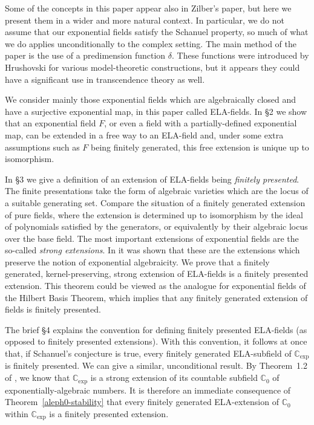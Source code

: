 \documentclass[12pt]{amsart}
\theoremstyle{definition}
\begin{document}
Some of the concepts in this paper appear also in Zilber's paper, but here we present them in a wider and more natural context. In particular, we do not assume that our exponential fields satisfy the Schanuel property, so much of what we do applies unconditionally to the complex setting. The main method of the paper is the use of a predimension function $\delta$. These functions were introduced by Hrushovski \cite{Hru93} for various model-theoretic constructions, but it appears they could have a significant use in transcendence theory as well.

We consider mainly those exponential fields which are algebraically closed and have a surjective exponential map, in this paper called ELA-fields. In \S2 we show that an exponential field $F$, or even a field with a partially-defined exponential map, can be extended in a free way to an ELA-field and, under some extra assumptions such as $F$ being finitely generated, this free extension is unique up to isomorphism. 

In \S3 we give a definition of an extension of ELA-fields being \emph{finitely presented}. The finite presentations take the form of algebraic varieties which are the locus of a suitable generating set. Compare the situation of a finitely generated extension of pure fields, where the extension is determined up to isomorphism by the ideal of polynomials satisfied by the generators, or equivalently by their algebraic locus over the base field. The most important extensions of exponential fields are the so-called \emph{strong extensions}. In \cite{EAEF} it was shown that these are the extensions which preserve the notion of exponential algebraicity. We prove that a finitely generated, kernel-preserving, strong extension of ELA-fields is a finitely presented extension. This theorem could be viewed as the analogue for exponential fields of the Hilbert Basis Theorem, which implies that any finitely generated extension of fields is finitely presented.

The brief \S4 explains the convention for defining finitely presented ELA-fields (as opposed to finitely presented extensions). With this convention, it follows at once that, if Schanuel's conjecture is true, every finitely generated ELA-subfield of ${\ensuremath{\mathbb{C}_{\mathrm{exp}}}}$ is finitely presented. We can give a similar, unconditional result. By Theorem~1.2 of \cite{EAEF}, we know that ${\ensuremath{\mathbb{C}_{\mathrm{exp}}}}$ is a strong extension of its countable subfield ${\ensuremath{\mathbb{C}}}_0$ of exponentially-algebraic numbers. It is therefore an immediate consequence of Theorem~\ref{aleph0-stability} that every finitely generated ELA-extension of ${\ensuremath{\mathbb{C}}}_0$ within ${\ensuremath{\mathbb{C}_{\mathrm{exp}}}}$ is a finitely presented extension.
\end{document}
